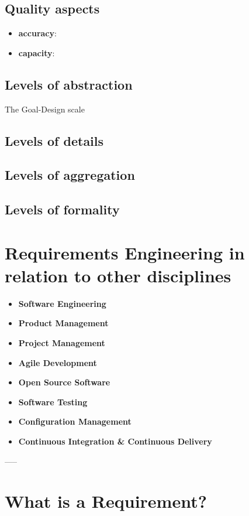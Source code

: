 \subsection*{Quality aspects}
\begin{itemize}
  \item \textbf{accuracy}:
  \item \textbf{capacity}:
\end{itemize}

\subsection*{Levels of abstraction}
The Goal-Design scale
\subsection*{Levels of details}

\subsection*{Levels of aggregation}

\subsection*{Levels of formality}



\section*{Requirements Engineering in relation to other disciplines}

\begin{itemize}
  \item \textbf{Software Engineering}
  \item \textbf{Product Management}
  \item \textbf{Project Management}
  \item \textbf{Agile Development}
  \item \textbf{Open Source Software}
  \item \textbf{Software Testing}
  \item \textbf{Configuration Management}
  \item \textbf{Continuous Integration \& Continuous Delivery}
\end{itemize}

----- 

\section{What is a Requirement?}

